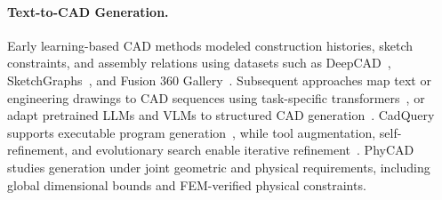 

\paragraph{Text-to-CAD Generation.}
Early learning-based CAD methods modeled construction histories, sketch constraints, and assembly relations using datasets such as DeepCAD~\citep{wu2021deepcad}, SketchGraphs~\citep{seff2020sketchgraphs}, and Fusion 360 Gallery~\citep{willis2021fusion,willis2022joinable}. Subsequent approaches map text or engineering drawings to CAD sequences using task-specific transformers~\citep{khan2024text2cad,qin2025drawing2cad}, or adapt pretrained LLMs and VLMs to structured CAD generation~\citep{li2025cad,govindarajan2025cadmium,yuan2024openecad}. CadQuery supports executable program generation~\citep{xie2025text}, while tool augmentation, self-refinement, and evolutionary search enable iterative refinement~\citep{mallis2025cad,li2026seek,preintner2025evocad}. PhyCAD studies generation under joint geometric and physical requirements, including global dimensional bounds and FEM-verified physical constraints.


